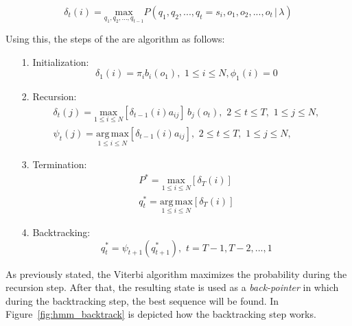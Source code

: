 \begin{equation}
	\delta_{t}(i) =  \underset{q_{1},q_{2}, ... , q_{t-1}}{\mathrm{max}} P (q_{1},q_{2}, ... , q_{t} = s_{i}, o_{1}, o_{2}, ... , o_{t} \, | \, \lambda)
\end{equation}

\noindent Using this, the steps of the are algorithm as follows:

\begin{itemize}
	\item[1.]{Initialization:} \\
	\begin{equation}
		\delta_{1}(i) = \pi_{i}b_{i}(o_{1}), \,\, 1 \leq i \leq N, \phi_{1}(i) = 0
	\end{equation}

	\item[2.]{Recursion:} \\
	\begin{subequations}
		\begin{align}
		\delta_{t}(j) = \underset{1\leq i \leq N}{\mathrm{max}} [\delta_{t-1}(i)a_{ij}] \, b_{j}(o_{t}), \,\, 2 \leq t \leq T, \,\, 1 \leq j \leq N, \\
		\psi_{t}(j) = \underset{1\leq i \leq N}{\mathrm{arg \, max}} [\delta_{t-1}(i)a_{ij}], \,\, 2 \leq t \leq T, \,\, 1 \leq j \leq N,
		\end{align}
	\end{subequations}

	\item[3.]{Termination:} \\
	\begin{subequations}
		\begin{align}
		P^{*} = \underset{1\leq i \leq N}{\mathrm{max}}[\delta_{T}(i)] \\
		q_{t}^{*} = \underset{1\leq i \leq N}{\mathrm{arg \, max}}[\delta_{T}(i)]
		\end{align}
	\end{subequations}

	\item[4.]{Backtracking:} \\
	\begin{equation}
		q_{t}^{*} = \psi_{t+1}(q_{t+1}^{*}), \,\, t = T - 1, T - 2, ... , 1
	\end{equation}
\end{itemize}

\noindent As previously stated, the Viterbi algorithm maximizes the probability during the recursion step. After that, the resulting state is used as a \textit{back-pointer} in which during the backtracking step, the best sequence will be found. In Figure~\ref{fig:hmm_backtrack} is depicted how the backtracking step works.

